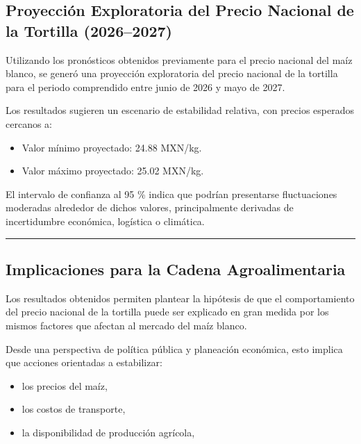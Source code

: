 \documentclass[11pt]{article}
\providecommand{\tightlist}{%
      \setlength{\itemsep}{0pt}\setlength{\parskip}{0pt}}
\begin{document}
\hypertarget{proyecciuxf3n-exploratoria-del-precio-nacional-de-la-tortilla-20262027}{%
\subsection{Proyección Exploratoria del Precio Nacional de la Tortilla
(2026--2027)}\label{proyecciuxf3n-exploratoria-del-precio-nacional-de-la-tortilla-20262027}}

Utilizando los pronósticos obtenidos previamente para el precio nacional
del maíz blanco, se generó una proyección exploratoria del precio
nacional de la tortilla para el periodo comprendido entre junio de 2026
y mayo de 2027.

Los resultados sugieren un escenario de estabilidad relativa, con
precios esperados cercanos a:

\begin{itemize}
\tightlist
\item
  Valor mínimo proyectado: 24.88 MXN/kg.
\item
  Valor máximo proyectado: 25.02 MXN/kg.
\end{itemize}

El intervalo de confianza al 95 \% indica que podrían presentarse
fluctuaciones moderadas alrededor de dichos valores, principalmente
derivadas de incertidumbre económica, logística o climática.

\begin{center}\rule{0.5\linewidth}{0.5pt}\end{center}

\hypertarget{implicaciones-para-la-cadena-agroalimentaria}{%
\subsection{Implicaciones para la Cadena
Agroalimentaria}\label{implicaciones-para-la-cadena-agroalimentaria}}

Los resultados obtenidos permiten plantear la hipótesis de que el
comportamiento del precio nacional de la tortilla puede ser explicado en
gran medida por los mismos factores que afectan al mercado del maíz
blanco.

Desde una perspectiva de política pública y planeación económica, esto
implica que acciones orientadas a estabilizar:

\begin{itemize}
\tightlist
\item
  los precios del maíz,
\item
  los costos de transporte,
\item
  la disponibilidad de producción agrícola,
\end{itemize}
\end{document}

